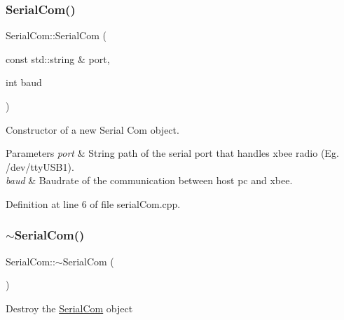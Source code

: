 \subsubsection{\texorpdfstring{Serial\+Com()}{SerialCom()}}
{\footnotesize\ttfamily Serial\+Com\+::\+Serial\+Com (\begin{DoxyParamCaption}\item[{const std\+::string \&}]{port,  }\item[{int}]{baud }\end{DoxyParamCaption})}

Constructor of a new Serial Com object.


\begin{DoxyParams}{Parameters}
{\em port} & String path of the serial port that handles xbee radio (Eg. /dev/tty\+U\+S\+B1). \\
\hline
{\em baud} & Baudrate of the communication between host pc and xbee. \\
\hline
\end{DoxyParams}


Definition at line 6 of file serial\+Com.\+cpp.


\mbox{\label{class_serial_com_a5582cf804e661a24cb32720b31a2f9fe}} 
\subsubsection{\texorpdfstring{$\sim$\+Serial\+Com()}{~SerialCom()}}
{\footnotesize\ttfamily Serial\+Com\+::$\sim$\+Serial\+Com (\begin{DoxyParamCaption}{ }\end{DoxyParamCaption})}

Destroy the \hyperlink{class_serial_com}{Serial\+Com} object 

